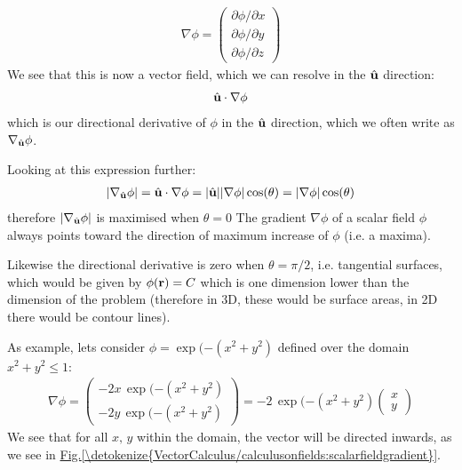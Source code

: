 \documentclass[letterpaper,10pt,english]{jupyterBook}
\begin{document}
\begin{equation*}
\begin{split}\nabla \phi = \begin{pmatrix}
 \partial\phi/\partial x \\
 \partial\phi/\partial y \\
 \partial\phi/\partial z 
\end{pmatrix} \end{split}
\end{equation*}
\sphinxAtStartPar
We see that this is now a vector field, which we can resolve in the \(\hat{\bf u}\) direction:
\begin{equation*}
\begin{split}\hat{\bf u} \cdot \nabla \phi\end{split}
\end{equation*}
\sphinxAtStartPar
which is our directional derivative of \(\phi\) in the \(\hat{\bf u}\) direction, which we often write as \(\nabla_{\hat{\bf u}} \phi\).

\sphinxAtStartPar
Looking at this expression further:
\begin{equation*}
\begin{split}|\nabla_{\hat{\bf u}} \phi| = \hat{\bf u} \cdot \nabla \phi = |\hat{\bf u}||\nabla \phi|\cos (\theta) = |\nabla \phi|\cos (\theta)\end{split}
\end{equation*}
\sphinxAtStartPar
therefore \(|\nabla_{\hat{\bf u}} \phi|\) is maximised when \(\theta = 0\) \sphinxhyphen{} The gradient \(\nabla \phi\) of a scalar field \(\phi\) always points toward the
direction of maximum increase of \(\phi\) (i.e. a maxima).

\sphinxAtStartPar
Likewise the directional derivative is zero when \(\theta = \pi/2\), i.e. tangential surfaces, which would be given by \(\phi({\bf r}) = C\) which is
one dimension lower than the dimension of the problem (therefore in 3D, these would be surface areas, in 2D there would be contour lines).

\sphinxAtStartPar
As example, lets consider \(\phi = \exp(-(x^2+y^2)\) defined over the domain \(x^2 + y^2 \leq 1\):
\begin{equation*}
\begin{split}\nabla \phi = \begin{pmatrix}
 -2x\,\exp(-(x^2+y^2) \\
 -2y\,\exp(-(x^2+y^2)
\end{pmatrix} = -2\,\exp(-(x^2+y^2) \begin{pmatrix}
 x \\
 y
\end{pmatrix}\end{split}
\end{equation*}
\sphinxAtStartPar
We see that for all \(x,\, y\) within the domain, the vector will be directed inwards, as we see in \hyperref[\detokenize{VectorCalculus/calculusonfields:scalarfieldgradient}]{Fig.\@ \ref{\detokenize{VectorCalculus/calculusonfields:scalarfieldgradient}}}.
\end{document}
